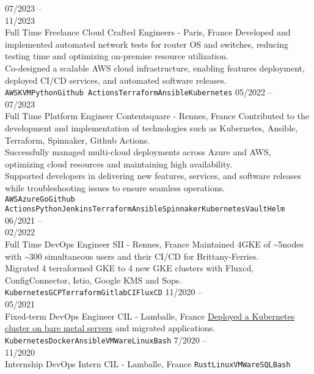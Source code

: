 \documentclass[10pt]{developercv} %
\begin{document}
\begin{entrylist}
	\entry
		{07/2023 --\\11/2023\\\footnotesize{Full Time}}
		{Freelance}
		{Cloud Crafted Engineers - Paris, France}
		{Developed and implemented automated network tests for router OS and switches, reducing testing time and optimizing on-premise resource utilization.\\
		Co-designed a scalable AWS cloud infrastructure, enabling features deployment, deployed CI/CD services, and automated software releases.\\
		\texttt{AWS}\slashsep\texttt{KVM}\slashsep\texttt{Python}\slashsep\texttt{Github Actions}\slashsep\texttt{Terraform}\slashsep\texttt{Ansible}\slashsep\texttt{Kubernetes}}
	\entry
		{05/2022 --\\07/2023\\\footnotesize{Full Time}}
		{Platform Engineer}
		{Contentsquare - Rennes, France}
		{Contributed to the development and implementation of technologies such as Kubernetes, Ansible, Terraform, Spinnaker, Github Actions.\\
		Successfully managed multi-cloud deployments across Azure and AWS, optimizing cloud resources and maintaining high availability.\\
		Supported developers in delivering new features, services, and software releases while troubleshooting issues to ensure seamless operations.\\
		\texttt{AWS}\slashsep\texttt{Azure}\slashsep\texttt{Go}\slashsep\texttt{Github Actions}\slashsep\texttt{Python}\slashsep\texttt{Jenkins}\slashsep\texttt{Terraform}\slashsep\texttt{Ansible}\slashsep\texttt{Spinnaker}\slashsep\texttt{Kubernetes}\slashsep\texttt{Vault}\slashsep\texttt{Helm}}
	\entry
		{06/2021 --\\02/2022\\\footnotesize{Full Time}}
		{DevOps Engineer}
		{SII - Rennes, France}
		{Maintained 4GKE of \textasciitilde5nodes with \textasciitilde300 simultaneous users and their CI/CD for Brittany-Ferries.\\
Migrated 4 terraformed GKE to 4 new GKE clusters with Fluxcd, ConfigConnector, Istio, Google KMS and Sops.\\
		\texttt{Kubernetes}\slashsep\texttt{GCP}\slashsep\texttt{Terraform}\slashsep\texttt{GitlabCI}\slashsep\texttt{FluxCD}}
	\entry
		{11/2020 --\\05/2021\\\footnotesize{Fixed-term}}
		{DevOps Engineer}
		{CIL - Lamballe, France}
		{\href{https://github.com/Ant0wan/VMWare-Kubenetes-cluster}{Deployed a Kubernetes cluster on bare metal servers} and migrated applications.\\
		\texttt{Kubernetes}\slashsep\texttt{Docker}\slashsep\texttt{Ansible}\slashsep\texttt{VMWare}\slashsep\texttt{Linux}\slashsep\texttt{Bash}}
	\entry
		{7/2020 --\\11/2020\\\footnotesize{Internship}}
		{DevOps Intern}
		{CIL - Lamballe, France}
		{\texttt{Rust}\slashsep\texttt{Linux}\slashsep\texttt{VMWare}\slashsep\texttt{SQL}\slashsep\texttt{Bash}}
\end{entrylist}
\end{document}
